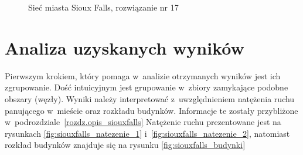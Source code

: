\documentclass[twoside,12pt]{report}
\begin{document}
\begin{figure}[htbp]
\centering
{}
\caption{Sieć miasta Sioux Falls, rozwiązanie nr 17}
\label{fig:sioux17}
\end{figure}

\clearpage
\section{Analiza uzyskanych wyników}\label{rozdz.analiza_uzyskanych_wynikow}
Pierwszym krokiem, który pomaga w~analizie otrzymanych wyników jest ich zgrupowanie. Dość intuicyjnym jest grupowanie w~zbiory zamykające podobne obszary (węzły). Wyniki należy interpretować z~uwzględnieniem natężenia ruchu panującego w~mieście oraz rozkładu budynków. Informacje te zostały przybliżone w~podrozdziale~\ref{rozdz.opis_siouxfalls} Natężenie ruchu prezentowane jest na rysunkach \ref{fig:siouxfalls_natezenie_1} i~\ref{fig:siouxfalls_natezenie_2}, natomiast rozkład budynków znajduje się na rysunku \ref{fig:siouxfalls_budynki}
\end{document}
